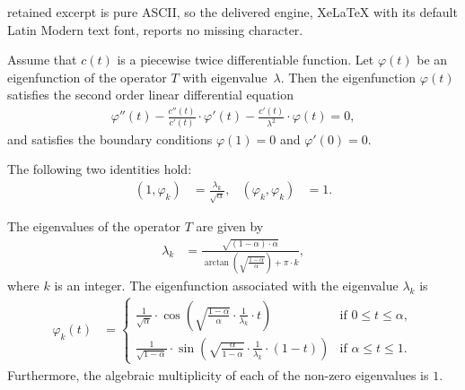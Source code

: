 \documentclass[10pt,a4paper]{amsart}
\newcommand{\bl}[2]{(#1,#2)}
\begin{document}
retained excerpt is pure ASCII, so the delivered engine, XeLaTeX with its default Latin Modern text font, reports no missing character.
\begin{proposition}
Assume that $c(t)$ is a piecewise twice differentiable function.
Let $\varphi(t)$ be an eigenfunction
of the operator $T$ with eigenvalue~$\lambda$.
Then the eigenfunction $\varphi(t)$ satisfies
the second order linear differential equation
\begin{align*}
\varphi''(t)
-
\frac{c''(t)}{c'(t)} \cdot \varphi'(t)
-
\frac{c'(t)}{\lambda^{2}} \cdot \varphi(t)
=
0,
\end{align*}
and satisfies the boundary conditions
$\varphi(1) = 0$ and $\varphi'(0) = 0$.
\label{proposition_general_2nd_order}
\end{proposition}

\begin{lemma}
The following two identities hold:
\begin{align*}
\bl{1}{\varphi_{k}}
& = 
\frac{\lambda_{k}}{\sqrt{\alpha}} , &
\bl{\varphi_{k}}{\varphi_{k}}
& = 
1.
\end{align*}
\label{lemma_unit_length}
\end{lemma}

\begin{proposition}
The eigenvalues of the operator $T$ are given by
\begin{align}
\lambda_{k}
& =
\frac{\sqrt{(1-\alpha) \cdot \alpha}}
{
\arctan\left(\sqrt{\frac{1-\alpha}{\alpha}}\right)
+
\pi \cdot k
} ,
\label{equation_eigenvalue}
\end{align}
where $k$ is an integer.
The eigenfunction associated with the eigenvalue $\lambda_{k}$ is
\begin{align*}
\varphi_{k}(t)
& =
\begin{cases}
\frac{1}{\sqrt{\alpha}}
\cdot
\cos\left( \sqrt{\frac{1-\alpha}{\alpha}} \cdot \frac{1}{\lambda_{k}} \cdot  t \right)
&
\text{if } 0 \leq t \leq \alpha , 
\\
\frac{1}{\sqrt{1-\alpha}}
\cdot
\sin\left( \sqrt{\frac{\alpha}{1-\alpha}} \cdot \frac{1}{\lambda_{k}} \cdot (1-t) \right)
&
\text{if } \alpha \leq t \leq 1 . 
\end{cases}
\end{align*}
Furthermore, the algebraic multiplicity of each of the non-zero
eigenvalues is $1$.
\end{proposition}
\end{document}
